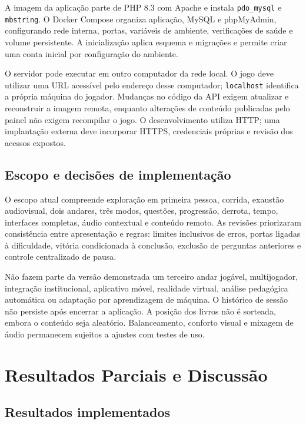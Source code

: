 \documentclass[12pt]{article}
\begin{document}
A imagem da aplicação parte de PHP 8.3 com Apache e instala \texttt{pdo\_mysql} e \texttt{mbstring}. O Docker Compose organiza aplicação, MySQL e phpMyAdmin, configurando rede interna, portas, variáveis de ambiente, verificações de saúde e volume persistente. A inicialização aplica esquema e migrações e permite criar uma conta inicial por configuração do ambiente.

O servidor pode executar em outro computador da rede local. O jogo deve utilizar uma URL acessível pelo endereço desse computador; \texttt{localhost} identifica a própria máquina do jogador. Mudanças no código da API exigem atualizar e reconstruir a imagem remota, enquanto alterações de conteúdo publicadas pelo painel não exigem recompilar o jogo. O desenvolvimento utiliza HTTP; uma implantação externa deve incorporar HTTPS, credenciais próprias e revisão dos acessos expostos.

\subsection{Escopo e decisões de implementação}

O escopo atual compreende exploração em primeira pessoa, corrida, exaustão audiovisual, dois andares, três modos, questões, progressão, derrota, tempo, interfaces completas, áudio contextual e conteúdo remoto. As revisões priorizaram consistência entre apresentação e regras: limites inclusivos de erros, portas ligadas à dificuldade, vitória condicionada à conclusão, exclusão de perguntas anteriores e controle centralizado de pausa.

Não fazem parte da versão demonstrada um terceiro andar jogável, multijogador, integração institucional, aplicativo móvel, realidade virtual, análise pedagógica automática ou adaptação por aprendizagem de máquina. O histórico de sessão não persiste após encerrar a aplicação. A posição dos livros não é sorteada, embora o conteúdo seja aleatório. Balanceamento, conforto visual e mixagem de áudio permanecem sujeitos a ajustes com testes de uso.

\section{Resultados Parciais e Discussão}

\subsection{Resultados implementados}
\end{document}
